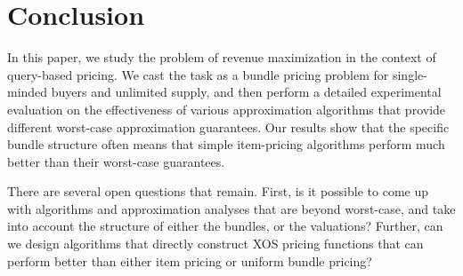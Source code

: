 \section{Conclusion}
\label{sec:conclusion}

In this paper, we study the problem of revenue maximization in the context of query-based pricing.
We cast the task as a bundle pricing problem for single-minded buyers and unlimited supply, and then
perform a detailed experimental evaluation on the effectiveness of various approximation
algorithms that provide different worst-case approximation guarantees. Our results show that the specific
bundle structure often means that simple item-pricing algorithms perform much better than their worst-case
guarantees.  

There are several open questions that remain. First, is it possible to 
come up with algorithms and approximation analyses that are beyond worst-case, and take into account
the structure of either the bundles, or the valuations? Further, can we design 
algorithms that directly construct XOS pricing functions that can perform better than either item pricing
or uniform bundle pricing?

